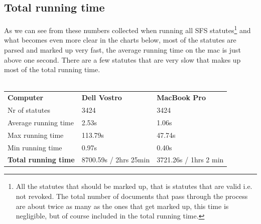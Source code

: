 \subsection{Total running time}
As we can see from these numbers collected when running all SFS statutes\footnote{All the statutes that should be marked up, that is statutes that are valid i.e. not revoked. The total number of documents that pass through the process are about twice as many as the ones that get marked up, this time is negligible, but of course included in the total running time.} and what becomes even more clear in the charts below, most of the statutes are parsed and marked up very fast, the average running time on the mac is just above one second. There are a few statutes that are very slow that makes up most of the total running time.\\\\
\begin{tabular}{l l l}
\textbf{Computer} & \textbf{Dell Vostro} & \textbf{MacBook Pro}\\
Nr of statutes & 3424 & 3424\\
Average running time	& 2.53s & 1.06s\\
Max running time &  113.79s & 47.74s\\
Min running time & 0.97s & 0.40s\\
\textbf{Total running time} & 8700.59s / 2hrs 25min & 3721.26s / 1hrs 2 min\\
\end{tabular}
\linebreak
\newline
